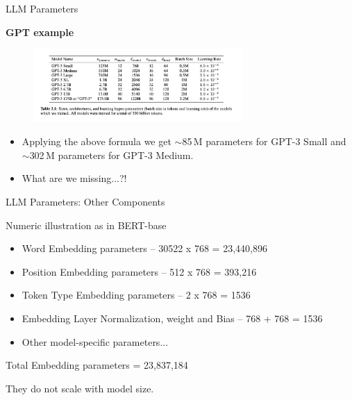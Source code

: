 \begin{vbframe}{LLM Parameters}

\vfill

\textbf{GPT example}


\vfill

\begin{figure}
\centering
\includegraphics[width = 8cm]{figure/gptsize}
\end{figure}

\begin{itemize}
\item Applying the above formula we get $\sim$85\,M parameters for GPT-3 Small and $\sim$302\,M parameters for GPT-3 Medium. 

\item What are we missing...?!

\end{itemize}



\vfill

\end{vbframe}


\begin{vbframe}{LLM Parameters: Other Components}

\vfill

Numeric illustration as in BERT-base \\ \vskip5mm

\begin{itemize}
    \item Word Embedding parameters -- 30522 x 768 = 23,440,896
    \item Position Embedding parameters -- 512 x 768 = 393,216
	\item Token Type Embedding parameters -- 2 x 768 = 1536
	\item Embedding Layer Normalization, weight and Bias -- 768 + 768 = 1536
	\item Other model-specific parameters...
\end{itemize}

\vskip5mm

Total Embedding parameters = 23,837,184 \vskip3mm

They do not scale with model size.

\vfill

\end{vbframe}

